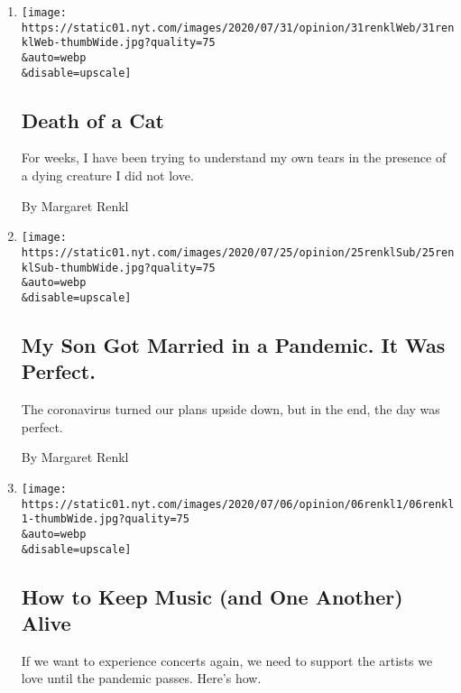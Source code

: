\begin{enumerate}
\def\labelenumi{\arabic{enumi}.}
\item
  \href{/2020/08/03/opinion/feral-cat-dying.html}{}

  \texttt{[image: https://static01.nyt.com/images/2020/07/31/opinion/31renklWeb/31renklWeb-thumbWide.jpg?quality=75\\\&auto=webp\\\&disable=upscale]}

  \hypertarget{death-of-a-cat}{%
  \subsection{Death of a Cat}\label{death-of-a-cat}}

  For weeks, I have been trying to understand my own tears in the
  presence of a dying creature I did not love.

  By Margaret Renkl
\item
  \href{/2020/07/26/opinion/coronavirus-wedding.html}{}

  \texttt{[image: https://static01.nyt.com/images/2020/07/25/opinion/25renklSub/25renklSub-thumbWide.jpg?quality=75\\\&auto=webp\\\&disable=upscale]}

  \hypertarget{my-son-got-married-in-a-pandemic-it-was-perfect}{%
  \subsection{My Son Got Married in a Pandemic. It Was
  Perfect.}\label{my-son-got-married-in-a-pandemic-it-was-perfect}}

  The coronavirus turned our plans upside down, but in the end, the day
  was perfect.

  By Margaret Renkl
\item
  \href{/2020/07/05/opinion/coronavirus-chase-rice-country-music.html}{}

  \texttt{[image: https://static01.nyt.com/images/2020/07/06/opinion/06renkl1/06renkl1-thumbWide.jpg?quality=75\\\&auto=webp\\\&disable=upscale]}

  \hypertarget{how-to-keep-music-and-one-another-alive}{%
  \subsection{How to Keep Music (and One Another)
  Alive}\label{how-to-keep-music-and-one-another-alive}}

  If we want to experience concerts again, we need to support the
  artists we love until the pandemic passes. Here's how.


\end{enumerate}

